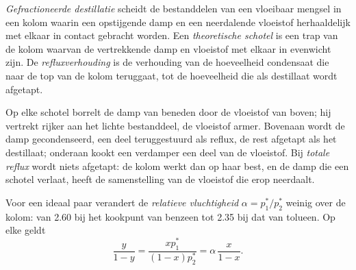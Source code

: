 \begin{definition}\label{def:b2:liquid-vapour-diagrams:fractional-distillation}
\emph{Gefractioneerde destillatie} scheidt de
bestanddelen van een vloeibaar mengsel in een kolom waarin een opstijgende damp en een
neerdalende vloeistof herhaaldelijk met elkaar in contact gebracht worden. Een \emph{theoretische
schotel} is een trap van de kolom waarvan de vertrekkende damp
en vloeistof met elkaar in evenwicht zijn. De
\emph{refluxverhouding} is de verhouding van de hoeveelheid condensaat die
naar de top van de kolom teruggaat, tot de hoeveelheid die als destillaat wordt afgetapt.
\end{definition}

Op elke schotel borrelt de damp van beneden door de vloeistof van boven; hij
vertrekt rijker aan het lichte bestanddeel, de vloeistof armer. Bovenaan wordt de damp
gecondenseerd, een deel teruggestuurd als reflux, de rest afgetapt als het
destillaat; onderaan kookt een verdamper een deel van de vloeistof. Bij
\textit{totale reflux} wordt niets afgetapt: de kolom werkt dan op haar best,
en de damp die een schotel verlaat, heeft de samenstelling van de vloeistof die erop
neerdaalt.


Voor een ideaal paar verandert de \textit{relatieve vluchtigheid} $\alpha = p_1^*/p_2^*$
weinig over de kolom: van 2.60 bij het kookpunt van benzeen tot
2.35 bij dat van tolueen. Op elke  geldt
\[
  \frac{y}{1 - y} = \frac{xp_1^*}{(1 - x)p_2^*} = \alpha\,\frac{x}{1 - x} .
\]

